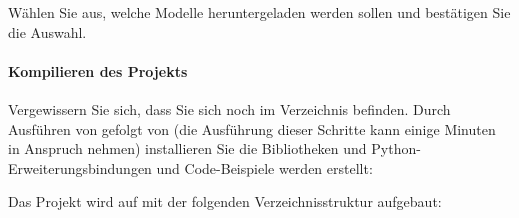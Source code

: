 
Wählen Sie aus, welche Modelle heruntergeladen werden sollen und bestätigen Sie die Auswahl.

\paragraph{Kompilieren des Projekts}

Vergewissern Sie sich, dass Sie sich noch im Verzeichnis  befinden.
Durch Ausführen von  gefolgt von  (die Ausführung dieser Schritte kann einige Minuten in Anspruch nehmen) installieren Sie die Bibliotheken und Python-Erweiterungsbindungen und Code-Beispiele werden erstellt:

\medskip

 \newline         
{} \newline
{} \newline
{} \newline

\medskip

Das Projekt wird auf  mit der folgenden Verzeichnisstruktur aufgebaut:

\bigskip


\bigskip



